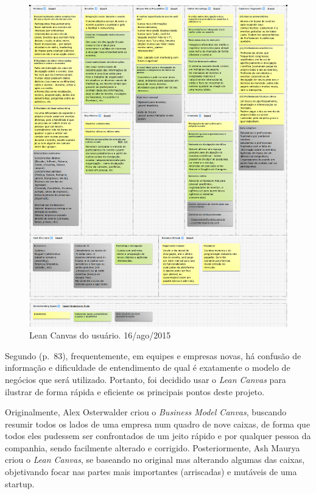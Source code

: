 \documentclass[12pt,a4paper,twoside,hyphens,english,brazil]{abntex2}
\begin{document}
\begin{figure}[!bp]
	\centering
	\includegraphics[width=1\linewidth]{imagens/canvas-usuarios.png}
	\caption{Lean Canvas do usuário. 16/ago/2015}
\end{figure}

Segundo \citeauthor{manual-startup} (p.~83), frequentemente, em equipes e empresas novas, há confusão de informação e dificuldade de entendimento de qual é exatamente o modelo de negócios que será utilizado. Portanto, foi decidido usar o \emph{Lean Canvas} para ilustrar de forma rápida e eficiente os principais pontos deste projeto.

Originalmente, Alex Osterwalder criou o \emph{Business Model Canvas}, buscando resumir todos os lados de uma empresa num quadro de nove caixas, de forma que todos eles pudessem ser confrontados de um jeito rápido e por qualquer pessoa da companhia, sendo facilmente alterado e corrigido. Posteriormente, Ash Maurya criou o \emph{Lean Canvas}, se baseando no original mas alterando algumas das caixas, objetivando focar nas partes mais importantes (arriscadas) e mutáveis de uma startup.\cite{why-lean-canvas}
\end{document}
